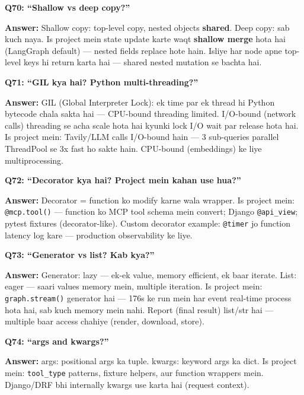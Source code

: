\begin{interviewbox}
\textbf{Q70: ``Shallow vs deep copy?''}

\textbf{Answer:} Shallow copy: top-level copy, nested objects \textbf{shared}. Deep copy: sab kuch naya. Is project mein state update karte waqt \textbf{shallow merge} hota hai (LangGraph default) --- nested fields replace hote hain. Isliye har node apne top-level keys hi return karta hai --- shared nested mutation se bachta hai.
\end{interviewbox}

\begin{interviewbox}
\textbf{Q71: ``GIL kya hai? Python multi-threading?''}

\textbf{Answer:} GIL (Global Interpreter Lock): ek time par ek thread hi Python bytecode chala sakta hai --- CPU-bound threading limited. I/O-bound (network calls) threading se acha scale hota hai kyunki lock I/O wait par release hota hai. Is project mein: Tavily/LLM calls I/O-bound hain --- 3 sub-queries parallel ThreadPool se 3x fast ho sakte hain. CPU-bound (embeddings) ke liye multiprocessing.
\end{interviewbox}

\begin{interviewbox}
\textbf{Q72: ``Decorator kya hai? Project mein kahan use hua?''}

\textbf{Answer:} Decorator = function ko modify karne wala wrapper. Is project mein: \texttt{@mcp.tool()} --- function ko MCP tool schema mein convert; Django \texttt{@api\_view}; pytest fixtures (decorator-like). Custom decorator example: \texttt{@timer} jo function latency log kare --- production observability ke liye.
\end{interviewbox}

\begin{interviewbox}
\textbf{Q73: ``Generator vs list? Kab kya?''}

\textbf{Answer:} Generator: lazy --- ek-ek value, memory efficient, ek baar iterate. List: eager --- saari values memory mein, multiple iteration. Is project mein: \texttt{graph.stream()} generator hai --- 176s ke run mein har event real-time process hota hai, sab kuch memory mein nahi. Report (final result) list/str hai --- multiple baar access chahiye (render, download, store).
\end{interviewbox}

\begin{interviewbox}
\textbf{Q74: ``\*args and \*\*kwargs?''}

\textbf{Answer:} \*args: positional args ka tuple. \*\*kwargs: keyword args ka dict. Is project mein: \texttt{tool\_type} patterns, fixture helpers, aur function wrappers mein. Django/DRF bhi internally kwargs use karta hai (request context).
\end{interviewbox}

